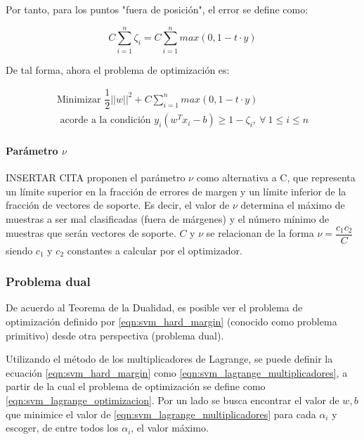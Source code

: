 Por tanto, para los puntos "fuera de posición", el error se define como:

\begin{equation}
	C\sum_{i=1}^{n} \zeta_{i} = C\sum_{i=1}^{n} max\left(0,1-t\cdot y\right)
	\label{eqn:svm_error_soft_margin}
\end{equation}

De tal forma, ahora el problema de optimización es:

\begin{equation}
	\begin{split}
		\mbox{Minimizar } \dfrac{1}{2} ||w||^{2} + C\sum_{i=1}^{n} max\left(0,1-t\cdot y\right) \\	
		\mbox{ acorde a la condición } y_{i}(w^{T}x_{i}-b)\geq 1-\zeta_{i},\: \forall\: 1\leq i\leq n
	\end{split}
	\label{eqn:svm_soft_margin}
\end{equation}

\paragraph{Parámetro $\nu$} INSERTAR CITA proponen el parámetro $\nu$ como alternativa a C, que representa un límite superior en la fracción de errores de margen y un límite inferior de la fracción de vectores de soporte. Es decir, el valor de $\nu$ determina el máximo de muestras a ser mal clasificadas (fuera de márgenes) y el número mínimo de muestras que serán vectores de soporte. $C$ y $\nu$ se relacionan de la forma $\nu = \dfrac{c_{1}c_{2}}{C}$ siendo $c_{1}$ y $c_{2}$ constantes a calcular por el optimizador.

\subsubsection{Problema dual}

De acuerdo al Teorema de la Dualidad, es posible ver el problema de optimización definido por \ref{eqn:svm_hard_margin} (conocido como problema primitivo) desde otra perspectiva (problema dual).

Utilizando el método de los multiplicadores de Lagrange, se puede definir la ecuación \ref{eqn:svm_hard_margin} como \ref{eqn:svm_lagrange_multiplicadores}, a partir de la cual el problema de optimización se define como \ref{eqn:svm_lagrange_optimizacion}. Por un lado se busca encontrar el valor de $w,b$ que minimice el valor de \ref{eqn:svm_lagrange_multiplicadores} para cada $\alpha_{i}$ y escoger, de entre todos los $\alpha_{i}$, el valor máximo.

